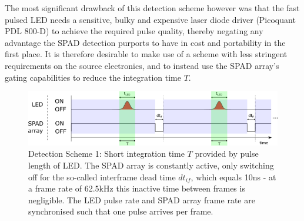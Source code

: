 \documentclass[]{article}
\begin{document}
	The most significant drawback of this detection scheme however was that the fast pulsed LED needs a sensitive, bulky and expensive laser diode driver (Picoquant PDL 800-D) to achieve the required pulse quality, thereby negating any advantage the SPAD detection purports to have in cost and portability in the first place. It is therefore desirable to make use of a scheme with less stringent requirements on the source electronics, and to instead use the SPAD array's gating capabilities to reduce the integration time $T$.
	
		\begin{figure}[ht]
			\centering
			\includegraphics[width=0.8\linewidth]{Figures/detectionScheme1}
			\caption{Detection Scheme 1: Short integration time $T$ provided by pulse length of LED. The SPAD array is constantly active, only switching off for the so-called interframe dead time $dt_{if}$, which equals 10ns - at a frame rate of 62.5kHz this inactive time between frames is negligible. The LED pulse rate and SPAD array frame rate are synchronised such that one pulse arrives per frame.}
			\label{fig:detectionscheme1}
		\end{figure}
		
\end{document}
